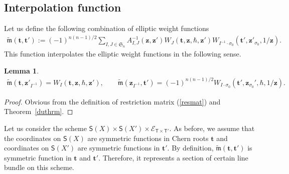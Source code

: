 \documentclass[10pt,a4paper]{amsart}
\newcommand{\bT}{\mathsf{T}}
\newcommand{\cE}{\mathscr{E}}
\def\ttt{{\boldsymbol t}}
\def\zz{{\boldsymbol z}}
\numberwithin{equation}{section}
\newtheorem{Lemma}[Theorem]{Lemma}
\begin{document}
\subsection{Interpolation function}
Let us define the following combination of elliptic weight functions
\begin{gather*}
\tilde{\mathfrak{m}}(\ttt,\ttt'):=(-1)^{n(n-1)/2}\sum\limits_{I,J\in \mathfrak{S}_n} A_{I,J}^{-1}(\zz,\zz') W_{J}(\ttt,\zz,\hbar,\zz') W_{I^{-1}\cdot \sigma_{0}}(\ttt',\zz'_{\sigma_0},1/\zz).
\end{gather*}
This function interpolates the elliptic weight functions in the following sense.
\begin{Lemma} \label{motherlemma}
 \begin{gather*}
 \tilde{\mathfrak{m}}(\ttt,\zz'_{I^{-1}})= W_{I}(\ttt,\zz,\hbar,\zz'), \qquad \tilde{\mathfrak{m}}(\zz_{I^{-1}},\ttt')= (-1)^{n(n-1)/2} W_{I \cdot \sigma_{0}}(\ttt',\zz_{\sigma_0}',\hbar,1/\zz).
 \end{gather*}
\end{Lemma}
\begin{proof}
 Obvious from the definition of restriction matrix (\ref{resmat}) and Theorem~\ref{duthrm}.
\end{proof}

Let us consider the scheme $\mathsf{S}(X)\times \mathsf{S}(X') \times \cE_{\bT\times \bT'}$. As before, we assume that the coordinates on
$\mathsf{S}(X)$ are symmetric functions in Chern roots $\ttt$ and coordinates on $\mathsf{S}(X')$
are symmetric functions in $\ttt'$. By definition, $\tilde{\mathfrak{m}}(\ttt,\ttt')$ is symmetric function in $\ttt$ and $\ttt'$. Therefore, it represents a section of certain line bundle on this scheme.
\end{document}
